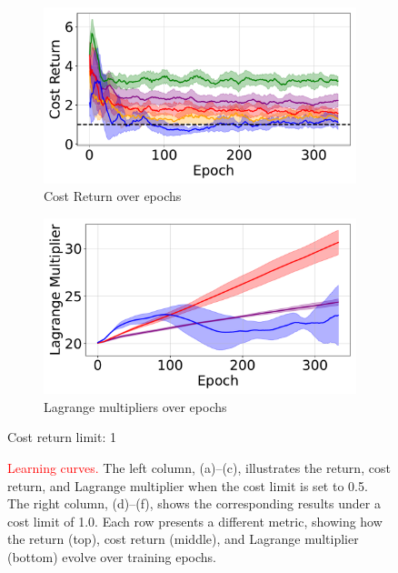 \begin{figure}[H]
\begin{minipage}{0.48\textwidth}
        \begin{subfigure}{\linewidth}
            \centering
            \includegraphics[width=\linewidth]{figure/PointGoal/limit 1/EpCost.pdf}
            \caption{Cost Return over epochs}
        \end{subfigure}

        \begin{subfigure}{\linewidth}
            \centering
            \includegraphics[width=\linewidth]{figure/PointGoal/limit 1/lagrange.pdf}
            \caption{Lagrange multipliers over epochs}
        \end{subfigure}

        \caption*{Cost return limit: 1}
    \end{minipage}

    \caption{\textcolor{red}{Learning curves.} 
    The left column, (a)–(c), illustrates the return, cost return, and Lagrange multiplier when the cost limit is set to 0.5. 
    The right column, (d)–(f), shows the corresponding results under a cost limit of 1.0. 
    Each row presents a different metric, showing how the return (top), cost return (middle), and Lagrange multiplier (bottom) evolve over training epochs.}
    \label{fig:point_goal_results_vertical1}
\end{figure}

